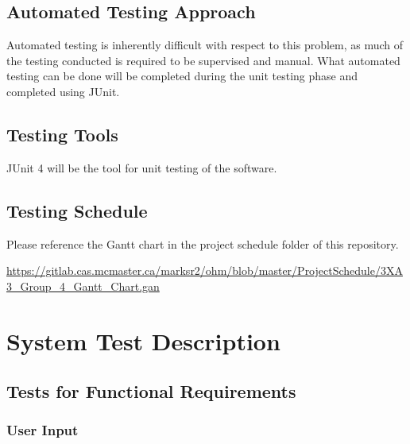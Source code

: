 \documentclass[12pt, titlepage]{article}
\begin{document}
\subsection{Automated Testing Approach}
Automated testing is inherently difficult with respect to this problem, as much of the testing conducted is required to be supervised and manual. What automated testing can be done will be completed during the unit testing phase and completed using JUnit.
\subsection{Testing Tools}
\par JUnit 4 will be the tool for unit testing of the software.
\subsection{Testing Schedule}
Please reference the Gantt chart in the project schedule folder of this repository.

\url{https://gitlab.cas.mcmaster.ca/marksr2/ohm/blob/master/ProjectSchedule/3XA3_Group_4_Gantt_Chart.gan}

\section{System Test Description}
	
\subsection{Tests for Functional Requirements}
\subsubsection{User Input}
\end{document}
